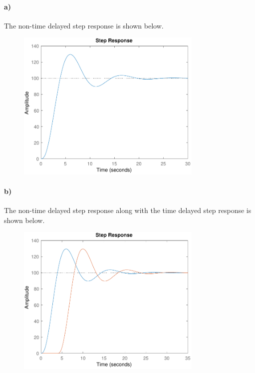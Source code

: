 \documentclass[12pt]{article}
\begin{document}
\pagebreak

\paragraph{a)}

The non-time delayed step response is shown below.
\begin{figure}[H]
    \begin{center}
        \includegraphics[width=3.5in]{problem10a.pdf}
    \end{center}
\end{figure}

\paragraph{b)}

The non-time delayed step response along with the time delayed step response is shown below.
\begin{figure}[H]
    \begin{center}
        \includegraphics[width=3.5in]{problem10b.pdf}
    \end{center}
\end{figure}
\end{document}
